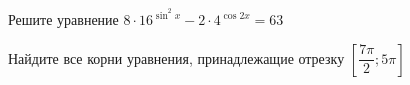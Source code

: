 \begin{ex}
	\begin{condition}
		\begin{enumcols}[label=\asbuk*)]
			\item Решите уравнение \( 8\cdot16^{\sin^2 x } - 2\cdot4^{\cos 2x}  = 63 \)
			\item Найдите все корни уравнения, принадлежащие отрезку \( \left[\dfrac{7\pi}{2};5\pi\right] \)
		\end{enumcols}
	\end{condition}
\end{ex}